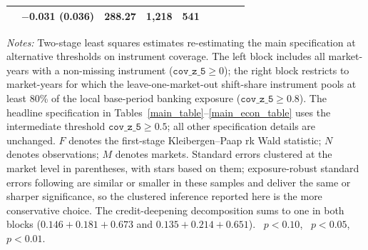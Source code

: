\begin{threeparttable}
{\begin{tabular}{lcccccccc}
        & $-$0.031 (0.036) & 288.27 & 1{,}218 & 541 \\
        \bottomrule
    \end{tabular}
    }
    \begin{tablenotes}[flushleft]
        \footnotesize
        \item \textit{Notes:} Two-stage least squares estimates re-estimating the main specification at alternative thresholds on instrument coverage. The left block includes all market-years with a non-missing instrument ($\texttt{cov\_z\_5} \geq 0$); the right block restricts to market-years for which the leave-one-market-out shift-share instrument pools at least 80\% of the local base-period banking exposure ($\texttt{cov\_z\_5} \geq 0.8$). The headline specification in Tables~\ref{main_table}--\ref{main_econ_table} uses the intermediate threshold $\texttt{cov\_z\_5} \geq 0.5$; all other specification details are unchanged. $F$ denotes the first-stage Kleibergen--Paap rk Wald statistic; $N$ denotes observations; $M$ denotes markets. Standard errors clustered at the market level in parentheses, with stars based on them; exposure-robust standard errors following \citet{adao2019shiftshare} are similar or smaller in these samples and deliver the same or sharper significance, so the clustered inference reported here is the more conservative choice. The credit-deepening decomposition sums to one in both blocks ($0.146+0.181+0.673$ and $0.135+0.214+0.651$). \sym{*}~$p<0.10$, \sym{**}~$p<0.05$, \sym{***}~$p<0.01$.
    \end{tablenotes}
\end{threeparttable}